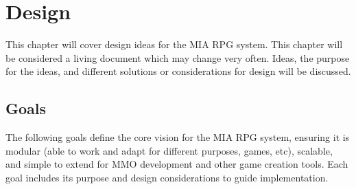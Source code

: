 \chapter{Design}\label{ch:design}
\pagestyle{fancy}

This chapter will cover design ideas for the MIA RPG system. This chapter will be considered a living document which may change very often. Ideas, the purpose for the ideas, and different solutions or considerations for design will be discussed.













\section{Goals}

The following goals define the core vision for the MIA RPG system, ensuring it is modular (able to work and adapt for different purposes, games, etc), scalable, and simple to extend for MMO development and other game creation tools. Each goal includes its purpose and design considerations to guide implementation.

